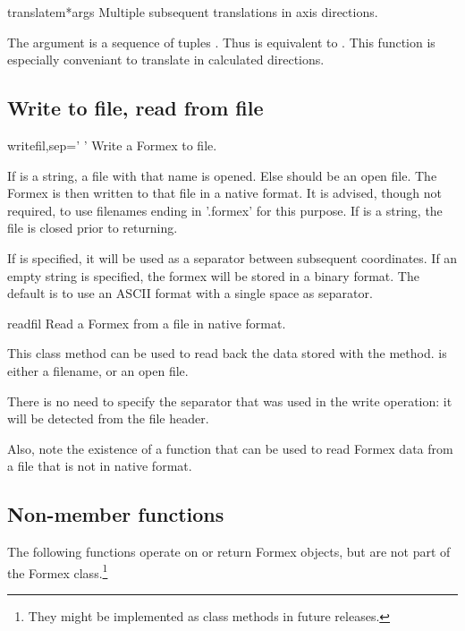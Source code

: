 {{\begin{methoddesc}{translatem}{*args}
Multiple subsequent translations in axis directions.

The argument  is a sequence of tuples . Thus  is equivalent to . This function is especially conveniant to translate in calculated directions.
\end{methoddesc}


\subsection{Write to file, read from file}


\begin{methoddesc}{write}{fil,sep=' '}
Write a Formex to file.

If  is a string, a file with that name is opened. Else  should
be an open file.
The Formex is then written to that file in a native format. It is advised, though not required, to use filenames ending in '.formex' for this purpose.
If  is a string, the file is closed prior to returning.

If  is specified, it will be used as a separator between subsequent coordinates. If an empty string is specified, the formex will be stored in a binary format. The default is to use an ASCII format with a single space as separator.
\end{methoddesc}


\begin{methoddesc}{read}{fil}
Read a Formex from a file in native format. 

This class method can be used to read back the data stored with the  method.  is either a filename, or an open file.

There is no need to specify the separator that was used in the write operation: it will be detected from the file header.

Also, note the existence of a  function that can be used to read Formex data from a file that is not in native format. 

\classmethod
\end{methoddesc}


\subsection{Non-member functions}
The following functions operate on or return Formex objects, but are not part of the Formex class.\footnote{They might be implemented as class methods in future releases.}

}}

